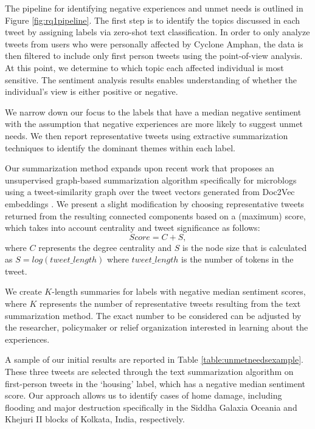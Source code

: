 \documentclass{article}
\begin{document}
The pipeline for identifying negative experiences and unmet needs is outlined in Figure
\ref{fig:rq1pipeline}. The first step is to identify the topics discussed in each tweet by assigning
labels via zero-shot text classification. In order to only analyze tweets from users who were
personally affected by Cyclone Amphan, the data is then filtered to include only first person tweets
using the point-of-view analysis. At this point, we determine to which topic each affected
individual is most sensitive. The sentiment analysis results enables understanding of whether the
individual's view is either positive or negative.

We narrow down our focus to the labels that have a median negative sentiment with the assumption
that negative experiences are more likely to suggest unmet needs. We then report representative
tweets using extractive summarization techniques to identify the dominant themes within each label.

Our summarization method expands upon recent work that proposes an unsupervised graph-based
summarization algorithm specifically for microblogs using a tweet-similarity graph over the tweet
vectors generated from Doc2Vec embeddings \cite{Dutta2018}. We present a slight modification by
choosing representative tweets returned from the resulting connected components based on a (maximum)
score, which takes into account centrality and tweet significance as follows: 
\begin{equation} Score = C + S, \end{equation}
where $C$ represents the degree centrality and $S$ is the node size that is calculated as 
$S = log(tweet\_length)$ where $tweet\_length$ is the number of tokens in the tweet.

We create $K$-length summaries for labels with negative median sentiment scores, where $K$
represents the number of representative tweets resulting from the text summarization method. The
exact number to be considered can be adjusted by the researcher, policymaker or relief organization
interested in learning about the experiences.

A sample of our initial results are reported in Table \ref{table:unmetneedsexample}. These three
tweets are selected through the text summarization algorithm on first-person tweets in the `housing'
label, which has a negative median sentiment score. Our approach allows us to identify cases of home
damage, including flooding and major destruction specifically in the Siddha Galaxia Oceania and
Khejuri II blocks of Kolkata, India, respectively.
\end{document}
